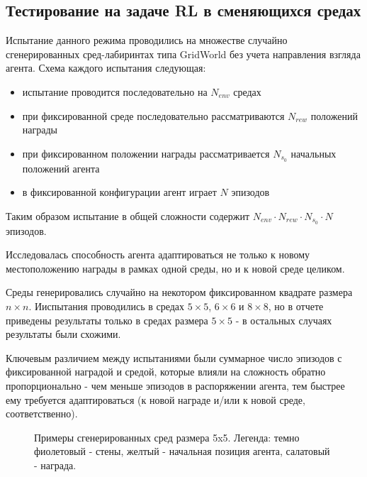 \documentclass[a4paper]{article}
\begin{document}
\subsection{Тестирование на задаче RL в сменяющихся средах}

Испытание данного режима проводились на множестве случайно сгенерированных сред-лабиринтах типа GridWorld без учета направления взгляда агента. Схема каждого испытания следующая:

\begin{itemize}
  \item испытание проводится последовательно на $N_{env}$ средах
  \item при фиксированной среде последовательно рассматриваются $N_{rew}$ положений награды
  \item при фиксированном положении награды рассматривается $N_{s_0}$ начальных положений агента
  \item в фиксированной конфигурации агент играет $N$ эпизодов
\end{itemize}

Таким образом испытание в общей сложности содержит $N_{env} \cdot N_{rew} \cdot N_{s_0} \cdot N$ эпизодов.

Исследовалась способность агента адаптироваться не только к новому местоположению награды в рамках одной среды, но и к новой среде целиком.

Среды генерировались случайно на некотором фиксированном квадрате размера $n \times n$. Ииспытания проводились в средах $5 \times 5$, $6 \times 6$ и $8 \times 8$, но в отчете приведены результаты только в средах размера $5 \times 5$ - в остальных случаях результаты были схожими.

Ключевым различием между испытаниями были суммарное число эпизодов с фиксированной наградой и средой, которые влияли на сложность обратно пропорционально - чем меньше эпизодов в распоряжении агента, тем быстрее ему требуется адаптироваться (к новой награде и/или к новой среде, соответственно).

\begin{figure}
  \centering
  \begin{minipage}{.49\linewidth}
    
  \end{minipage}
  \begin{minipage}{.49\linewidth}
    
  \end{minipage}
  \caption{Примеры сгенерированных сред размера 5x5. Легенда: темно фиолетовый - стены, желтый - начальная позиция агента, салатовый - награда.}
\end{figure}
\end{document}
